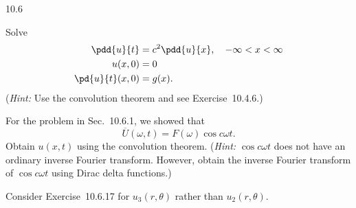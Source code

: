 \begin{exercises}{10.6}
\item[\starred 10.6.18.] Solve
\begin{align*}
\pdd{u}{t} &= c^2\pdd{u}{x}, \quad -\infty < x < \infty \\
u(x,0) &= 0 \\
\pd{u}{t}(x,0) &= g(x).
\end{align*}
(\textit{Hint:} Use the convolution theorem and see Exercise~10.4.6.)

\item For the problem in Sec.~10.6.1, we showed that
\[
\overline{U}(\omega,t) = F(\omega)\cos c\omega t.
\]
Obtain $u(x,t)$ using the convolution theorem.  (\textit{Hint:} $\cos c\omega t$ does not have an ordinary inverse Fourier transform.  However, obtain the inverse Fourier transform of $\cos c\omega t$ using Dirac delta functions.)

\item Consider Exercise~10.6.17 for $u_3(r,\theta)$ rather than $u_2(r,\theta)$.
\end{exercises}
